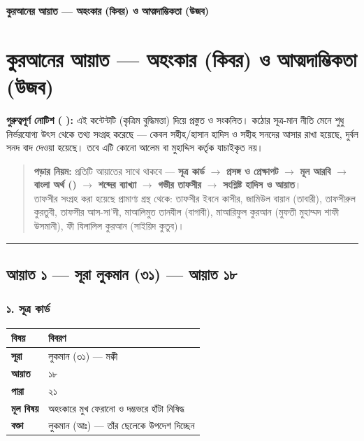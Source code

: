 

\begin{center}{\Large\bfseries\color{emerald} কুরআনের আয়াত — অহংকার (কিবর) ও আত্মদাম্ভিকতা (উজব)}\end{center}
\vspace{1em}
\section*{কুরআনের আয়াত — অহংকার (কিবর) ও আত্মদাম্ভিকতা (উজব)}

\begin{warnbox}
 \textbf{গুরুত্বপূর্ণ নোটিশ ( ):} এই কন্টেন্টটি  (কৃত্রিম বুদ্ধিমত্তা) দিয়ে প্রস্তুত ও সংকলিত।  কঠোর সূত্র-মান নীতি মেনে শুধু নির্ভরযোগ্য উৎস থেকে তথ্য সংগ্রহ করেছে — কেবল সহীহ/হাসান হাদিস ও সহীহ সনদের আসার রাখা হয়েছে, দুর্বল সনদ বাদ দেওয়া হয়েছে। তবে এটি কোনো আলেম বা মুহাদ্দিস কর্তৃক যাচাইকৃত নয়।
\end{warnbox}


\begin{quote}
\textbf{পড়ার নিয়ম:} প্রতিটি আয়াতের সাথে থাকবে — \textbf{সূত্র কার্ড} $\rightarrow$ \textbf{প্রসঙ্গ ও প্রেক্ষাপট} $\rightarrow$ \textbf{মূল আরবি} $\rightarrow$ \textbf{বাংলা অর্থ ()} $\rightarrow$ \textbf{শব্দের ব্যাখ্যা} $\rightarrow$ \textbf{গভীর তাফসীর} $\rightarrow$ \textbf{সংশ্লিষ্ট হাদিস ও আয়াত}। \\
তাফসীর সংগ্রহ করা হয়েছে প্রামাণ্য গ্রন্থ থেকে: তাফসীর ইবনে কাসীর, জামিউল বায়ান (তাবারী), তাফসীরুল কুরতুবী, তাফসীর আস-সা'দী, মাআলিমুত তানযীল (বাগাবী), মাআরিফুল কুরআন (মুফতী মুহাম্মদ শাফী উসমানী), ফী যিলালিল কুরআন (সাইয়িদ কুতুব)।
\end{quote}


\medskip\hrule\medskip

\subsection*{আয়াত ১ — সূরা লুকমান (৩১) — আয়াত ১৮}

\subsubsection*{১. সূত্র কার্ড}

\begin{table}[h]\centering\small
\begin{tabular}{ll}
বিষয় & বিবরণ \\
\hline
\textbf{সূরা} & লুকমান (৩১) — মক্কী \\
\textbf{আয়াত} & ১৮ \\
\textbf{পারা} & ২১ \\
\textbf{মূল বিষয়} & অহংকারে মুখ ফেরানো ও দম্ভভরে হাঁটা নিষিদ্ধ \\
\textbf{বক্তা} & লুকমান (আঃ) — তাঁর ছেলেকে উপদেশ দিচ্ছেন \\
\hline
\end{tabular}
\end{table}

